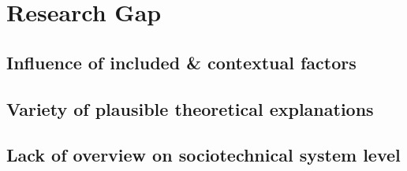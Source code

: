 \section{Research Gap}

\subsection{Influence of included \& contextual factors}
\subsection{Variety of plausible theoretical explanations}
\subsection{Lack of overview on sociotechnical system level}

